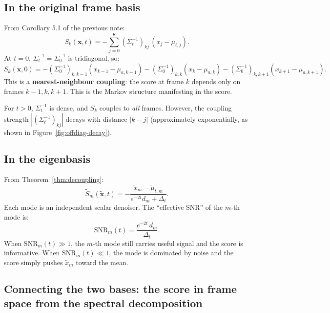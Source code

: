 \documentclass[11pt,a4paper]{article}
\newcommand{\Dt}{\Delta_t}
\begin{document}
\subsection{In the original frame basis}

From Corollary 5.1 of the previous note:
\begin{equation}\label{eq:sk-original}
  S_k(\mathbf{x}, t) = -\sum_{j=0}^{K} (\Sigma_t^{-1})_{kj}\,(x_j - \mu_{t,j}).
\end{equation}
At $t = 0$, $\Sigma_t^{-1} = \Sigma_0^{-1}$ is tridiagonal, so:
\begin{equation}\label{eq:sk-clean}
  S_k(\mathbf{x}, 0) = -(\Sigma_0^{-1})_{k,k-1}(x_{k-1} - \mu_{a,k-1}) - (\Sigma_0^{-1})_{k,k}(x_k - \mu_{a,k}) - (\Sigma_0^{-1})_{k,k+1}(x_{k+1} - \mu_{a,k+1}).
\end{equation}
This is a \textbf{nearest-neighbour coupling}: the score at frame $k$ depends only on frames $k-1, k, k+1$.  This is the Markov structure manifesting in the score.

For $t > 0$, $\Sigma_t^{-1}$ is dense, and $S_k$ couples to \emph{all} frames.  However, the coupling strength $|(\Sigma_t^{-1})_{kj}|$ decays with distance $|k - j|$ (approximately exponentially, as shown in Figure~\ref{fig:offdiag-decay}).

\subsection{In the eigenbasis}

From Theorem~\ref{thm:decoupling}:
\begin{equation}\label{eq:score-eigenbasis}
  \tilde{S}_m(\tilde{\mathbf{x}}, t) = -\frac{\tilde{x}_m - \tilde{\mu}_{t,m}}{e^{-2t}d_m + \Dt}.
\end{equation}
Each mode is an independent scalar denoiser.  The ``effective SNR'' of the $m$-th mode is:
\begin{equation}\label{eq:effective-snr}
  \text{SNR}_m(t) = \frac{e^{-2t}\,d_m}{\Dt}.
\end{equation}
When $\text{SNR}_m(t) \gg 1$, the $m$-th mode still carries useful signal and the score is informative.  When $\text{SNR}_m(t) \ll 1$, the mode is dominated by noise and the score simply pushes $\tilde{x}_m$ toward the mean.

\subsection{Connecting the two bases: the score in frame space from the spectral decomposition}
\end{document}
